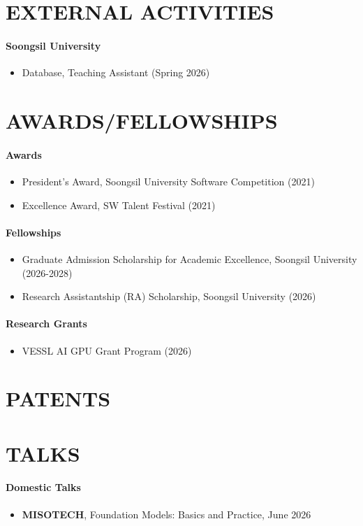 \documentclass[10pt,a4paper]{article} %
\newcommand{\seclabel}[1]{\section*{\uppercase{#1}}}
\begin{document}
\seclabel{External Activities}
\paragraph{Soongsil University}
\begin{itemize}[left=0pt]
    \item \small{Database, Teaching Assistant (Spring 2026)}
\end{itemize}

\seclabel{Awards/Fellowships}
\paragraph{Awards}
\begin{itemize}[left=0pt]
    \item \small{President's Award, Soongsil University Software Competition (2021)}
    \item \small{Excellence Award, SW Talent Festival (2021)}
\end{itemize}
\paragraph{Fellowships}
\begin{itemize}[left=0pt]
    \item \small{Graduate Admission Scholarship for Academic Excellence, Soongsil University (2026-2028)}
    \item \small{Research Assistantship (RA) Scholarship, Soongsil University (2026)}
\end{itemize}
\paragraph{Research Grants}
\begin{itemize}[left=0pt]
    \item \small{VESSL AI GPU Grant Program (2026)}
\end{itemize}

\seclabel{Patents}

\seclabel{Talks}
\paragraph{Domestic Talks}
\begin{itemize}[left=0pt]
    \item \small{\textbf{MISOTECH}, Foundation Models: Basics and Practice, June 2026}
\end{itemize}
\end{document}

